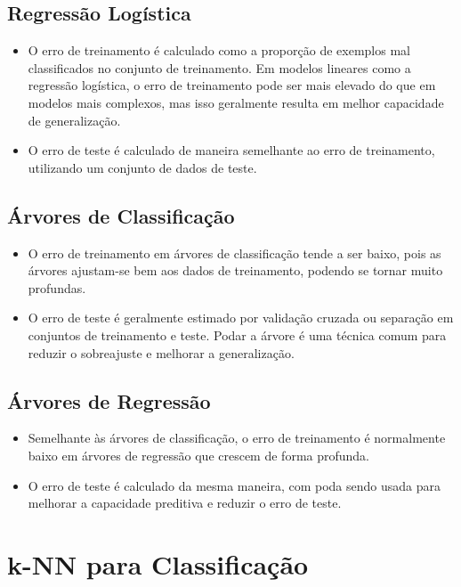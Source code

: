 \documentclass{sciposter}
\begin{document}
\begin{multicols}{3}
\subsection{Regressão Logística}
\begin{itemize}
    \item O erro de treinamento é calculado como a proporção de exemplos mal classificados no conjunto de treinamento. Em modelos lineares como a regressão logística, o erro de treinamento pode ser mais elevado do que em modelos mais complexos, mas isso geralmente resulta em melhor capacidade de generalização.
    \item O erro de teste é calculado de maneira semelhante ao erro de treinamento, utilizando um conjunto de dados de teste.
\end{itemize}

\subsection{Árvores de Classificação}
\begin{itemize}
    \item O erro de treinamento em árvores de classificação tende a ser baixo, pois as árvores ajustam-se bem aos dados de treinamento, podendo se tornar muito profundas.
    \item O erro de teste é geralmente estimado por validação cruzada ou separação em conjuntos de treinamento e teste. Podar a árvore é uma técnica comum para reduzir o sobreajuste e melhorar a generalização.
\end{itemize}

\subsection{Árvores de Regressão}
\begin{itemize}
    \item Semelhante às árvores de classificação, o erro de treinamento é normalmente baixo em árvores de regressão que crescem de forma profunda.
    \item O erro de teste é calculado da mesma maneira, com poda sendo usada para melhorar a capacidade preditiva e reduzir o erro de teste.
\end{itemize}

\section{k-NN para Classificação}


\end{multicols}
\end{document}
